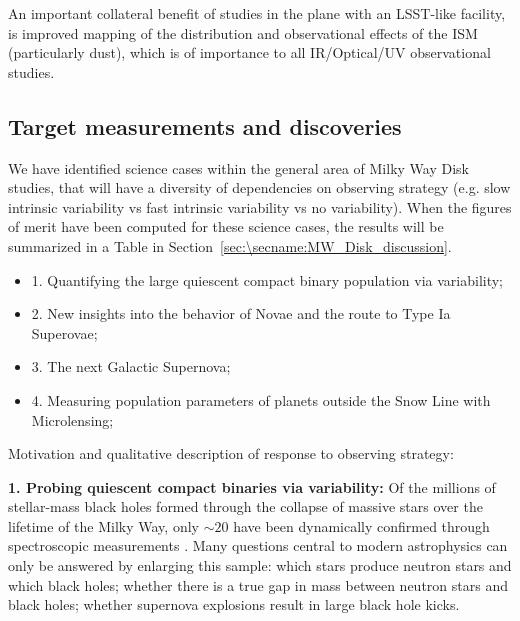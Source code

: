 An important collateral benefit of studies in the plane with an
LSST-like facility, is improved mapping of the distribution and
observational effects of the ISM (particularly dust), which is of
importance to all IR/Optical/UV observational studies. 


\subsection{Target measurements and discoveries}
\label{sec:\secname:MW_Disk_targets}



We have identified  science cases within the general area of Milky
Way Disk studies, that will have a diversity of dependencies on
observing strategy (e.g. slow intrinsic variability vs fast intrinsic
variability vs no variability). When the figures of merit have been
computed for these science cases, the results will be summarized in a Table in Section~\ref{sec:\secname:MW_Disk_discussion}.

\begin{itemize}
  \item 1. Quantifying the large quiescent compact binary population via variability;
  \item 2. New insights into the behavior of Novae and the route to Type Ia Superovae;
  \item 3. The next Galactic Supernova;
  \item 4. Measuring population parameters of planets outside the Snow Line with Microlensing;
\end{itemize}

Motivation and qualitative description of response to observing strategy:

{\bf 1. Probing quiescent compact binaries via variability:} Of the
millions of stellar-mass black holes formed through the collapse of
massive stars over the lifetime of the Milky Way, only $\sim 20$ have
been dynamically confirmed through spectroscopic measurements
\citep[e.g.,][]{2015arXiv151008869C}.  Many questions central to modern
astrophysics can only be answered by enlarging this sample: which
stars produce neutron stars and which black holes; whether there is a
true gap in mass between neutron stars and black holes; whether
supernova explosions result in large black hole kicks. 

